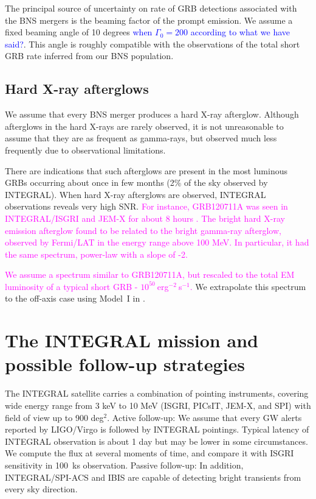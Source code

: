 \documentclass[11pt]{article}
\begin{document}
The principal source of uncertainty on rate of GRB detections associated with
the BNS mergers is the beaming factor of the prompt emission. We assume a fixed
beaming angle of 10 degrees \textcolor{blue}{when $\Gamma_{0} = 200$ according to what we have said?}. This angle is roughly compatible with the
observations of the total short GRB rate inferred from our BNS population. \\

\subsection*{Hard X-ray afterglows}

We assume that every BNS merger produces a hard X-ray afterglow. Although
afterglows in the hard X-rays are rarely observed, it is not unreasonable to
assume that they are as frequent as gamma-rays, but observed much less
frequently due to observational limitations.

There are indications that such afterglows are present in the most luminous GRBs
occurring about once in few months (2\% of the sky observed by INTEGRAL).  When
hard X-ray afterglows are observed, INTEGRAL observations reveals very high
SNR. \textcolor{magenta}{For instance, GRB120711A was seen in INTEGRAL/ISGRI and JEM-X for about 8
hours \citep{2014A&A...567A..84M}. The bright hard X-ray emission afterglow found to
be related to the bright gamma-ray afterglow, observed by Fermi/LAT in the
energy range above 100 MeV. In particular, it had the same spectrum, power-law
with a slope of -2.}

\textcolor{magenta}{We assume a spectrum similar to GRB120711A, but rescaled to the total EM
luminosity of a typical short GRB - $10^{50}~$erg$^{-2}~$s$^{-1}$.} We extrapolate
this spectrum to the off-axis case using Model~I in \citep{2016arXiv160606124P}.

\section*{The INTEGRAL mission and possible follow-up strategies}


The INTEGRAL satellite carries a combination of pointing instruments, covering
wide energy range from 3 keV to 10 MeV (ISGRI, PICsIT, JEM-X, and SPI) with
field of view up to 900 deg$^2$. Active follow-up: We assume that every
GW alerts reported by LIGO/Virgo is followed by INTEGRAL pointings. Typical
latency of INTEGRAL observation is about 1 day but may be lower in some
circumstances. We compute the flux at several moments of time, and compare it
with ISGRI sensitivity in 100~ks observation. Passive follow-up: In
addition, INTEGRAL/SPI-ACS and IBIS are capable of detecting bright transients
from every sky direction.
\end{document}
